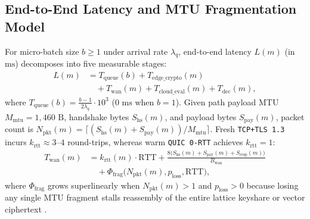 \documentclass[10pt,journal,compsoc]{IEEEtran}
\begin{document}
\subsection{End-to-End Latency and MTU Fragmentation Model}
For micro-batch size $b \ge 1$ under arrival rate $\lambda_q$, end-to-end latency $L(m)$ (in $\text{ms}$) decomposes into five measurable stages:
\begin{equation}
\begin{aligned}
L(m) &= T_{\text{queue}}(b) + T_{\text{edge\_crypto}}(m) \\
     &\quad + T_{\text{wan}}(m) + T_{\text{cloud\_eval}}(m) + T_{\text{dec}}(m),
\end{aligned}
\label{eq:latency_decomp}
\end{equation}
where $T_{\text{queue}}(b) = \frac{b-1}{2\lambda_q}\cdot 10^3$ ($0\text{ ms}$ when $b=1$). Given path payload MTU $M_{\text{mtu}} = 1{,}460\text{ B}$, handshake bytes $S_{\text{hs}}(m)$, and payload bytes $S_{\text{pay}}(m)$, packet count is $N_{\text{pkt}}(m) = \lceil (S_{\text{hs}}(m) + S_{\text{pay}}(m)) / M_{\text{mtu}} \rceil$. Fresh \texttt{TCP+TLS~1.3} incurs $k_{\text{rtt}} \approx 3\text{--}4$ round-trips, whereas warm \texttt{QUIC 0-RTT} achieves $k_{\text{rtt}} = 1$:
\begin{equation}
\begin{aligned}
T_{\text{wan}}(m) &= k_{\text{rtt}}(m)\cdot\text{RTT} + \frac{8\big(S_{\text{hs}}(m)+S_{\text{pay}}(m)+S_{\text{resp}}(m)\big)}{B_{\text{wan}}} \\
                  &\quad + \Phi_{\text{frag}}\big(N_{\text{pkt}}(m), p_{\text{loss}}, \text{RTT}\big),
\end{aligned}
\label{eq:wan_frag}
\end{equation}
where $\Phi_{\text{frag}}$ grows superlinearly when $N_{\text{pkt}}(m) > 1$ and $p_{\text{loss}} > 0$ because losing any single MTU fragment stalls reassembly of the entire lattice keyshare or vector ciphertext \cite{sikeridis2020pqctls_wan,sosnowski2023pqc_quic}.
\end{document}
